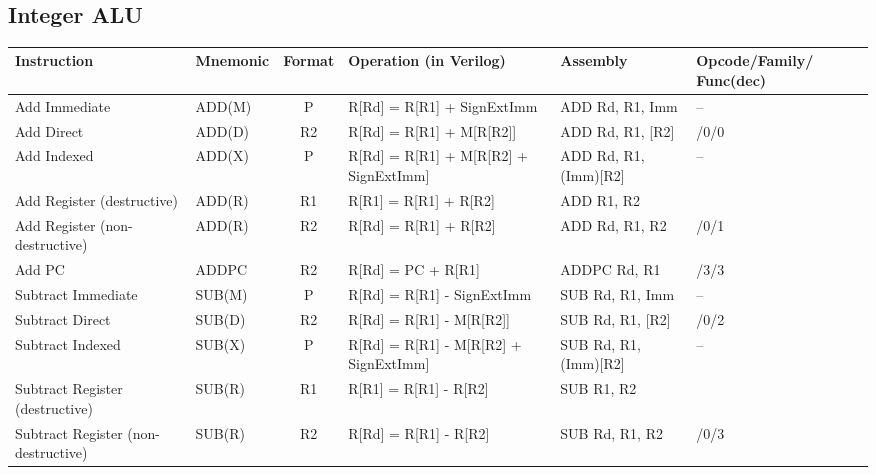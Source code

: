 \documentclass[a4paper,10pt]{article}
\begin{document}
 

\subsection*{Integer ALU}
\begin{tabular}{>{\raggedright\arraybackslash\hangindent=0.2cm\hangafter=1}p{2.5cm}lc>{\raggedright\arraybackslash\hangindent=2.5cm\hangafter=1}p{5cm}l>{\centering\arraybackslash}p{2cm}}
\toprule
Instruction & Mnemonic & Format & Operation (in Verilog) & Assembly & Opcode/Family/ Func(dec) \\
\midrule
Add Immediate & ADD(M) & P & R[Rd] = R[R1] + SignExtImm & ADD Rd, R1, Imm & --\\
Add Direct & ADD(D) & R2 & R[Rd] = R[R1] + M[R[R2]] & ADD Rd, R1, [R2] & 13/0/0\\
Add Indexed & ADD(X) & P & R[Rd] = R[R1] + M[R[R2] + SignExtImm] & ADD Rd, R1, (Imm)[R2] & --\\
Add Register (destructive) & ADD(R) & R1 & R[R1] = R[R1] + R[R2] & ADD R1, R2 & 8\\
Add Register (non-destructive) & ADD(R) & R2 & R[Rd] = R[R1] + R[R2] & ADD Rd, R1, R2 & 13/0/1\\
Add PC & ADDPC & R2 & R[Rd] = PC + R[R1] & ADDPC Rd, R1 & 13/3/3\\
Subtract Immediate & SUB(M) & P & R[Rd] = R[R1] - SignExtImm & SUB Rd, R1, Imm & --\\
Subtract Direct & SUB(D) & R2 & R[Rd] = R[R1] - M[R[R2]] & SUB Rd, R1, [R2] & 13/0/2\\
Subtract Indexed & SUB(X) & P & R[Rd] = R[R1] - M[R[R2] + SignExtImm] & SUB Rd, R1, (Imm)[R2] & --\\
Subtract Register (destructive) & SUB(R) & R1 & R[R1] = R[R1] - R[R2] & SUB R1, R2 & 9\\
Subtract Register (non-destructive) & SUB(R) & R2 & R[Rd] = R[R1] - R[R2] & SUB Rd, R1, R2 & 13/0/3\\
\bottomrule
\end{tabular}
\end{document}

